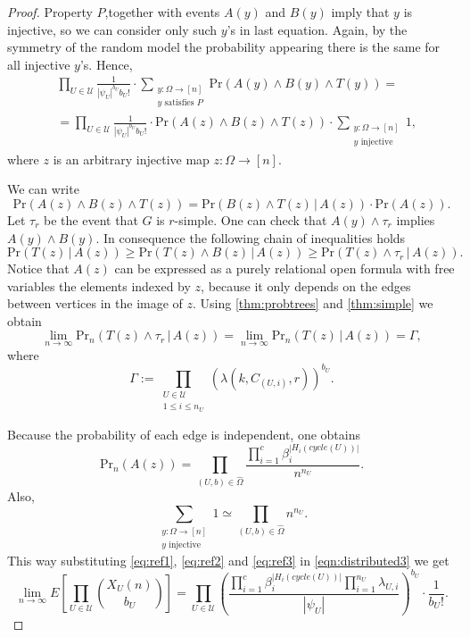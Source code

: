\documentclass[11pt,notitlepage,a4paper]{article}
\theoremstyle{definition}
\newcommand{\Ln}{\lim\limits_{n\to \infty}}
\begin{document}
\begin{proof}
	Property $P$,together with events $A(y)$ and $B(y)$ imply that $y$ is
	injective, so we can consider only such $y$'s in last equation. Again, by 
	the symmetry of the random model the probability appearing there is the same
	for all injective $y$'s. Hence,
	\begin{align}
	\nonumber
	&\prod_{U\in \mathcal{U}} 
	\frac{1}{|\psi_U|^{b_U}b_U!} \cdot
	\sum_{\substack{y:\Omega \rightarrow [n]\\y \text{ satisfies }P}}
	\mathrm{Pr}(A(y)\wedge B(y)\wedge T(y))= \\ 
	\label{eqn:distributed3}
	& =\prod_{U\in \mathcal{U}} 
	\frac{1}{|\psi_U|^{b_U}b_U!} \cdot \mathrm{Pr}(A(z)\wedge B(z)\wedge T(z)) \cdot
	\sum_{\substack{y:\Omega \rightarrow [n]\\y \text{ injective }}}1,
	\end{align}
	where $z$ is an arbitrary injective map $z:\Omega\rightarrow [n]$.\par
	We can write 
	\[\mathrm{Pr}(A(z)\wedge B(z)\wedge T(z))=\mathrm{Pr}(B(z)\wedge T(z) \, |\, A(z)) \cdot 
	\mathrm{Pr}(A(z)).\]
	Let $\tau_r$ be the event that $G$ is $r$-simple. One can check that
	$A(y) \wedge \tau_r$ implies $A(y)\wedge B(y)$. 
	In consequence the following chain of inequalities holds
	\[\mathrm{Pr}(T(z)\,|\, A(z))\geq \mathrm{Pr}(T(z)\wedge B(z) \,| \, A(z)) \geq
	 \mathrm{Pr}(T(z)\wedge \tau_r \,| \, A(z)).\]
	Notice that $A(z)$ can be expressed as a purely relational open formula
	with free variables the elements indexed by $z$, because it only depends on
	the edges between vertices in the image of $z$.
	Using \cref{thm:probtrees} and \cref{thm:simple} we obtain
	\begin{equation}\label{eq:ref1}
		\Ln \mathrm{Pr}_n(T(z)\wedge \tau_r \,| \, A(z))= \Ln \mathrm{Pr}_n(T(z) \,| \, A(z)) = \Gamma, 
	\end{equation}
	where
	\[ \Gamma:=\prod_{\substack{U\in \mathcal{U}\\ 1 \leq i\leq n_{U}}}
	(\lambda(k,C_{(U,i)}, r))^{b_U}.\]
	
	Because the probability of each edge is independent, one obtains 
	\begin{equation}\label{eq:ref2}
	 \mathrm{Pr}_n(A(z))= \prod_{(U,b)\in \widehat{\Omega}} 
	\frac{\prod_{i=1}^c	\beta_i^{|H_i(cycle(U))|}}{n^{n_U}}.  
	\end{equation}
	Also,
	\begin{equation}\label{eq:ref3}
	\sum_{\substack{y:\Omega \rightarrow [n]\\y \text{ injective }}}1
	\simeq \prod_{(U,b)\in \widehat{\Omega}} n^{n_U}. 
	\end{equation}
	This way substituting \cref{eq:ref1}, \cref{eq:ref2} and \cref{eq:ref3} in \cref{eqn:distributed3} we get
	\[\Ln E\left[\prod_{U\in \mathcal{U}}
	\binom{X_{U}(n)}{b_{U}}\right]= \prod_{U\in \mathcal{U}}
	\left(\frac{ \prod_{i=1}^c \beta_i^{|H_i(cycle(U))|} \prod_{i=1}^{n_U} \lambda_{U,i}}{|\psi_U|}\right)^{b_U}\cdot \frac{1}{b_{U}!}. \]
	

\end{proof}
\end{document}

